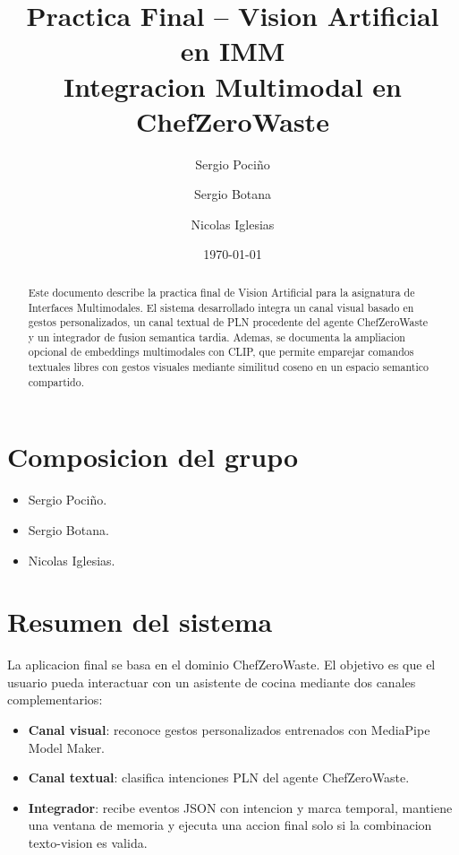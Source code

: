 \documentclass[12pt,a4paper]{article}
\title{
    \textbf{Practica Final -- Vision Artificial en IMM}\\
    \large Integracion Multimodal en ChefZeroWaste
}
\author{
    Sergio Pociño \and Sergio Botana \and Nicolas Iglesias
}
\date{\today}
\begin{document}
\maketitle
\thispagestyle{empty}

\begin{abstract}
Este documento describe la practica final de Vision Artificial para la asignatura de Interfaces Multimodales. El sistema desarrollado integra un canal visual basado en gestos personalizados, un canal textual de PLN procedente del agente ChefZeroWaste y un integrador de fusion semantica tardia. Ademas, se documenta la ampliacion opcional de embeddings multimodales con CLIP, que permite emparejar comandos textuales libres con gestos visuales mediante similitud coseno en un espacio semantico compartido.
\end{abstract}

\tableofcontents
\newpage

\section{Composicion del grupo}

\begin{itemize}
    \item Sergio Pociño.
    \item Sergio Botana.
    \item Nicolas Iglesias.
\end{itemize}

\section{Resumen del sistema}

La aplicacion final se basa en el dominio ChefZeroWaste. El objetivo es que el usuario pueda interactuar con un asistente de cocina mediante dos canales complementarios:

\begin{itemize}
    \item \textbf{Canal visual}: reconoce gestos personalizados entrenados con MediaPipe Model Maker.
    \item \textbf{Canal textual}: clasifica intenciones PLN del agente ChefZeroWaste.
    \item \textbf{Integrador}: recibe eventos JSON con intencion y marca temporal, mantiene una ventana de memoria y ejecuta una accion final solo si la combinacion texto-vision es valida.
\end{itemize}
\end{document}

